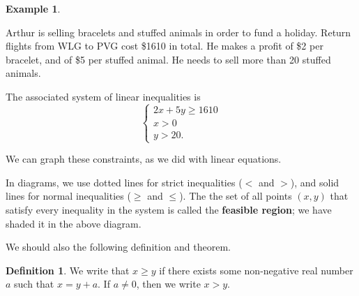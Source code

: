 \documentclass[a4paper,leqno]{article}
\numberwithin{equation}{section}
\theoremstyle{definition}
\newtheorem{defn}[equation]{Definition}
\newtheorem{ex}[equation]{Example}
\theoremstyle{remark}
\newcommand{\df}[1]{\textbf{#1}}
\begin{document}
\begin{ex}\leavevmode
  \begin{center}
    \itshape\parbox{0.8\textwidth}{
      Arthur is selling bracelets and stuffed animals in order to fund a holiday. Return flights from WLG to PVG cost \$1610 in total. He makes
      a profit of \$2 per bracelet, and of \$5 per stuffed animal. He needs to sell more than 20 stuffed animals.
    }
  \end{center}

  The associated system of linear inequalities is
  \begin{equation}
    \begin{cases}
      2x + 5y \geq 1610\\
      x > 0\\
      y > 20.
    \end{cases}
  \end{equation}

  We can graph these constraints, as we did with linear equations.
  \begin{center}
  \end{center}

  In diagrams, we use dotted lines for strict inequalities ($ < $ and $ > $), and solid lines for normal inequalities ($ \geq $ and $ \leq $).
  The the set of all points $ (x,y) $ that satisfy every inequality in the system is called the \df{feasible region}; we have shaded it in the
  above diagram.
\end{ex}

We should also the following definition and theorem.
\begin{defn}
  We write that $ x \geq y $ if there exists some non-negative real number $ a $ such that $ x = y + a $. If $ a \neq 0 $,
  then we write $ x > y $.
\end{defn}
\end{document}
